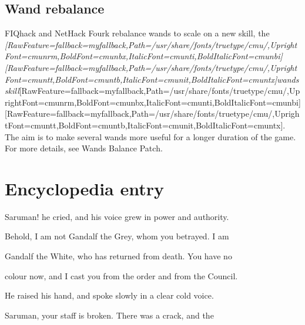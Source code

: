 \subsection{Wand rebalance}
\label{23}
FIQhack\footnotemark[196] and NetHack Fourk\footnotemark[197] rebalance wands to scale on a new skill, the {\itshape \allowbreak{}\setmainfont{cmunti.ttf}[RawFeature={fallback=myfallback},Path=/usr/share/fonts/truetype/cmu/,UprightFont=cmunrm,BoldFont=cmunbx,ItalicFont=cmunti,BoldItalicFont=cmunbi]\setmonofont{cmunti.ttf}[RawFeature={fallback=myfallback},Path=/usr/share/fonts/truetype/cmu/,UprightFont=cmuntt,BoldFont=cmuntb,ItalicFont=cmunit,BoldItalicFont=cmuntx]\itshape wands skill}\allowbreak{}\setmainfont{cmunrm.ttf}[RawFeature={fallback=myfallback},Path=/usr/share/fonts/truetype/cmu/,UprightFont=cmunrm,BoldFont=cmunbx,ItalicFont=cmunti,BoldItalicFont=cmunbi]\setmonofont{cmunrm.ttf}[RawFeature={fallback=myfallback},Path=/usr/share/fonts/truetype/cmu/,UprightFont=cmuntt,BoldFont=cmuntb,ItalicFont=cmunit,BoldItalicFont=cmuntx]. The aim is to make several wands more useful for a longer duration of the game. For more details, see Wands Balance Patch\footnotemark[198].



\section{Encyclopedia entry}
\label{24}

\textquotesingle{}Saruman!\textquotesingle{} he cried, and his voice grew in power and authority.$\text{ }$\newline{}

\textquotesingle{}Behold, I am not Gandalf the Grey, whom you betrayed.  I am$\text{ }$\newline{}

Gandalf the White, who has returned from death.  You have no$\text{ }$\newline{}

colour now, and I cast you from the order and from the Council.\textquotesingle{}$\text{ }$\newline{}

He raised his hand, and spoke slowly in a clear cold voice.$\text{ }$\newline{}

\textquotesingle{}Saruman, your staff is broken.\textquotesingle{}  There was a crack, and the$\text{ }$\newline{}

